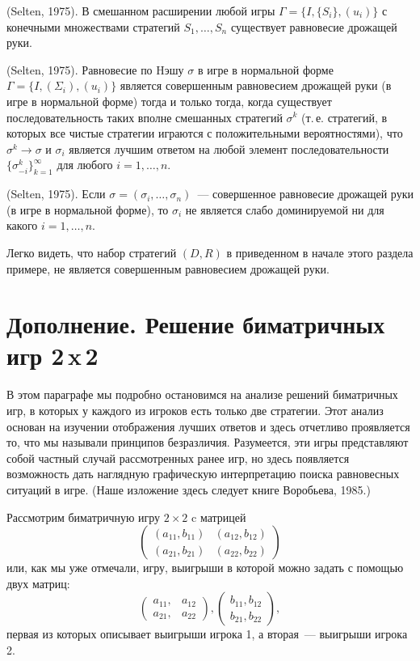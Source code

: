 {\begin{proposition} {\rm (Selten, 1975)}. В
смешанном расширении любой игры $\Gamma=\{I,\{S_i\},(u_i)\}$ с
конечными множествами стратегий $S_1,\ldots,S_n$ существует
равновесие дрожащей руки.
\end{proposition}

\begin{proposition} {\rm
(Selten, 1975)}. Равновесие по Hэшу $\sigma$ в игре в нормальной
форме $\Gamma=\{I,(\Sigma_i),(u_i)\}$ является совершенным
равновесием дрожащей руки (в игре в нормальной форме) тогда и только
тогда, когда существует последовательность таких вполне смешанных
стратегий $\sigma^k$ (т.\,е. стратегий, в которых все чистые
стратегии играются с положительными вероятностями), что
$\sigma^k\rightarrow\sigma$ и $\sigma_i$ является лучшим ответом на
любой элемент последовательности $\{\sigma^k_{-i}\}^\infty_{k=1}$
для любого $i=1,\ldots,n$.
\end{proposition}

\begin{proposition}
{\rm (Selten, 1975)}. Если $\sigma=(\sigma_i,\ldots,\sigma_n)$~---
совершенное равновесие дрожащей руки (в игре в нормальной форме), то
$\sigma_i$ не является слабо доминируемой ни для какого
$i=1,\ldots,n$.
\end{proposition}

Легко видеть, что набор стратегий $(D,R)$ в приведенном в начале
этого раздела примере, не является совершенным равновесием дрожащей
руки.

\section{Дополнение.  Решение биматричных игр 2\,x\,2}

В этом параграфе мы подробно остановимся на анализе решений
биматричных игр, в которых у каждого из игроков есть только две
стратегии. Этот анализ основан на изучении отображения лучших
ответов и здесь отчетливо проявляется то, что мы называли принципов
безразличия. Разумеется, эти игры представляют собой частный случай
рассмотренных ранее игр, но здесь появляется возможность дать
наглядную графическую интерпретацию поиска равновесных ситуаций в
игре.  (Наше изложение здесь следует книге Воробьева, 1985.)

Рассмотрим биматричную игру $2\times 2$ c матрицей
$$
\left(\begin{array}{cc}
(a_{11},b_{11})&(a_{12},b_{12})\\
(a_{21},b_{21})&(a_{22},b_{22})
\end{array} \right)
$$
или, как мы уже отмечали, игру, выигрыши в которой можно задать с
помощью двух матриц:
$$
\left(\begin{array}{cc}
a_{11},&a_{12}\\
a_{21},&a_{22}
\end{array} \right),
\left(\begin{array}{cc}
b_{11},b_{12}\\
b_{21},b_{22}
\end{array} \right),
$$
первая из которых описывает выигрыши игрока 1, а вторая~--- выигрыши
игрока 2.

}
